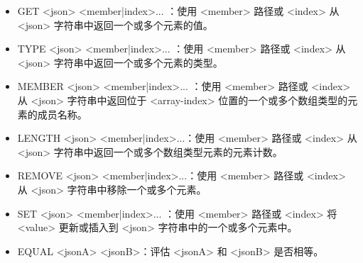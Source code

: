 \begin{itemize}
\item
GET <json> <member|index>... ：使用 <member> 路径或 <index> 从 <json> 字符串中返回一个或多个元素的值。

\item
TYPE <json> <member|index>... ：使用 <member> 路径或 <index> 从 <json> 字符串中返回一个或多个元素的类型。

\item
MEMBER <json> <member|index>... ：使用 <member> 路径或 <index> 从 <json> 字符串中返回位于 <array-index> 位置的一个或多个数组类型的元素的成员名称。

\item
LENGTH <json> <member|index>...：使用 <member> 路径或 <index> 从 <json> 字符串中返回一个或多个数组类型元素的元素计数。

\item
REMOVE <json> <member|index>...：使用 <member> 路径或 <index> 从 <json> 字符串中移除一个或多个元素。

\item
SET <json> <member|index>... ：使用 <member> 路径或 <index> 将 <value> 更新或插入到 <json> 字符串中的一个或多个元素中。

\item
EQUAL <jsonA> <jsonB>：评估 <jsonA> 和 <jsonB> 是否相等。
\end{itemize}




































